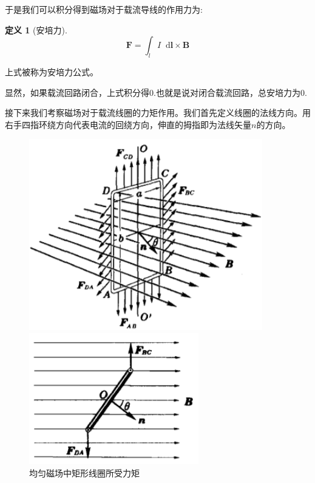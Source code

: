 \documentclass[12pt,a4paper,oneside]{report}
\theoremstyle{definition}
\newtheorem{definition}{定义}[chapter]
\theoremstyle{remark}
\renewcommand{\d}{\mathop{}\!\mathrm{d}}
\begin{document}
于是我们可以积分得到磁场对于载流导线的作用力为:
\begin{definition}[安培力]
\[
\mathbf{F} =\int_l I \d \mathbf{l} \times \mathbf{B} 
\]
\end{definition}

上式被称为安培力公式。

显然，如果载流回路闭合，上式积分得$0$.也就是说对闭合载流回路，总安培力为$0$.

接下来我们考察磁场对于载流线圈的力矩作用。我们首先定义线圈的法线方向。用右手四指环绕方向代表电流的回绕方向，伸直的拇指即为法线矢量$n$的方向。

\begin{figure}[h]
  \centering
  \begin{minipage}[t]{0.3\textwidth}
    \centering
    \includegraphics[width=\textwidth]{2-11.png}
    \caption{均匀磁场中矩形线圈所受力矩}
  \end{minipage}
  \hfill
  \begin{minipage}[t]{0.3\textwidth}
    \centering
    \includegraphics[width=\textwidth]{2-12.png}

\end{minipage}
\end{figure}
\end{document}
